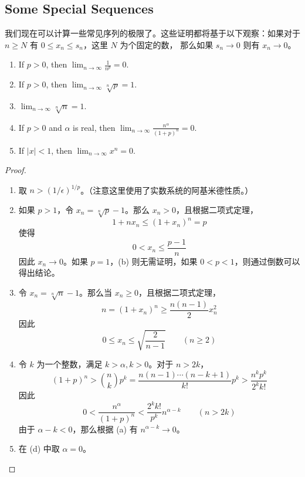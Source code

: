 \documentclass[../poma-notes.tex]{subfiles}
\begin{document}
\subsection*{Some Special Sequences}

我们现在可以计算一些常见序列的极限了。这些证明都将基于以下观察：如果对于 $n \ge N$ 有 $0 \le x_n \le s_n$，这里 $N$ 为个固定的数，
那么如果 $s_n \to 0$ 则有 $x_n \to 0$。

\begin{theorem}\mbox{}
  \begin{enumerate}[label=(\alph*)]
    \item If $p > 0$, then $\lim_{n \to \infty} \frac{1}{n^p} = 0$.
    \item If $p > 0$, then $\lim_{n \to \infty} \sqrt[n]{p} = 1$.
    \item $\lim_{n \to \infty} \sqrt[n]{n} = 1$.
    \item If $p > 0$ and $\alpha$ is real, then $\lim_{n \to \infty} \frac{n^{\alpha}}{(1 + p)^n} = 0$.
    \item If $|x| < 1$, then $\lim_{n \to \infty} x^n = 0$.
  \end{enumerate}
\end{theorem}

\begin{proof}
  \begin{enumerate}[label=(\alph*)]
    \item 取 $n > (1/\epsilon)^{1/p}$。（注意这里使用了实数系统的阿基米德性质。）
    \item 如果 $p > 1$，令 $x_n = \sqrt[n]{p} - 1$。那么 $x_n > 0$，且根据二项式定理，
          \[ 1 + nx_n \le (1 + x_n)^n = p \]
          使得
          \[ 0 < x_n \le \frac{p-1}{n} \]
          因此 $x_n \to 0$。如果 $p = 1$，(b) 则无需证明，如果 $0 < p < 1$，则通过倒数可以得出结论。
    \item 令 $x_n = \sqrt[n]{n} - 1$。那么当 $x_n \ge 0$，且根据二项式定理，
          \[ n = (1 + x_n)^n \ge \frac{n(n-1)}{2} x_n^2 \]
          因此
          \[ 0 \le x_n \le \sqrt{\frac{2}{n-1}} \qquad (n \ge 2) \]
    \item 令 $k$ 为一个整数，满足 $k > \alpha, k > 0$。对于 $n > 2k$，
          \[ (1+p)^n>\binom{n}{k}p^k=\frac{n(n-1)\cdots(n-k+1)}{k!}p^k>\frac{n^kp^k}{2^kk!}  \]
          因此
          \[ 0 < \frac{n^{\alpha}}{(1+p)^n} < \frac{2^kk!}{p^k} n^{\alpha-k} \qquad (n>2k)\]
          由于 $\alpha - k < 0$，那么根据 (a) 有 $n^{\alpha-k} \to 0$。
    \item 在 (d) 中取 $\alpha = 0$。
  \end{enumerate}
\end{proof}
\end{document}
